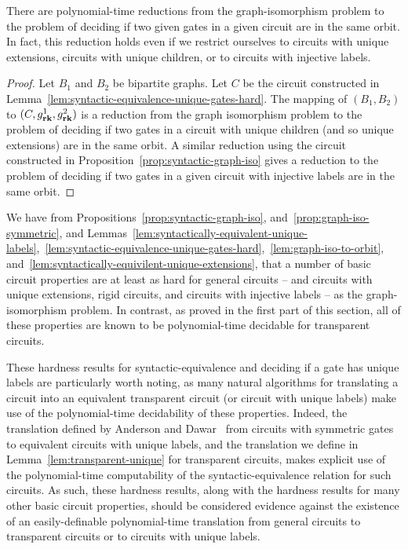 \documentclass[../paper.tex]{subfiles}
\begin{document}
\begin{lem}
  There are polynomial-time reductions from the graph-isomorphism problem to the
  problem of deciding if two given gates in a given circuit are in the same
  orbit. In fact, this reduction holds even if we restrict ourselves to circuits
  with unique extensions, circuits with unique children, or to circuits with
  injective labels.
  \label{lem:graph-iso-to-orbit}
\end{lem}
\begin{proof}
  Let $B_1$ and $B_2$ be bipartite graphs. Let $C$ be the circuit constructed in
  Lemma~\ref{lem:syntactic-equivalence-unique-gates-hard}. The mapping of $(B_1,
  B_2)$ to $(C, g^1_{\text{\textbf{rk}}}, g^2_{\text{\textbf{rk}}})$ is a reduction from the graph
  isomorphism problem to the problem of deciding if two gates in a circuit with
  unique children (and so unique extensions) are in the same orbit. A similar
  reduction using the circuit constructed in
  Proposition~\ref{prop:syntactic-graph-iso} gives a reduction to the problem of
  deciding if two gates in a given circuit with injective labels are in the same
  orbit.
\end{proof}

We have from Propositions~\ref{prop:syntactic-graph-iso},
and~\ref{prop:graph-iso-symmetric}, and
Lemmas~\ref{lem:syntactically-equivalent-unique-labels},~\ref{lem:syntactic-equivalence-unique-gates-hard},~\ref{lem:graph-iso-to-orbit},
and~\ref{lem:syntactically-equivilent-unique-extensions}, that a number of basic
circuit properties are at least as hard for general circuits -- and circuits
with unique extensions, rigid circuits, and circuits with injective labels -- as
the graph-isomorphism problem. In contrast, as proved in the first part of this
section, all of these properties are known to be polynomial-time decidable for
transparent circuits.

These hardness results for syntactic-equivalence and deciding if a gate has
unique labels are particularly worth noting, as many natural algorithms for
translating a circuit into an equivalent transparent circuit (or circuit with
unique labels) make use of the polynomial-time decidability of these properties.
Indeed, the translation defined by Anderson and Dawar~\cite{AndersonD17} from
circuits with symmetric gates to equivalent circuits with unique labels, and the
translation we define in Lemma~\ref{lem:transparent-unique} for transparent
circuits, makes explicit use of the polynomial-time computability of the
syntactic-equivalence relation for such circuits. As such, these hardness
results, along with the hardness results for many other basic circuit
properties, should be considered evidence against the existence of an
easily-definable polynomial-time translation from general circuits to
transparent circuits or to circuits with unique labels.
\end{document}
